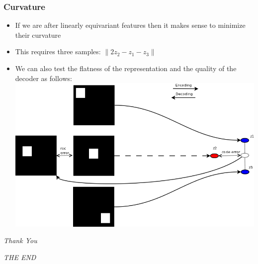 \documentclass{beamer}
\begin{document}
\begin{frame}
\frametitle{Curvature} 
\begin{itemize}
\item If we are after linearly equivariant features then it makes sense to minimize their curvature
\item This requires three samples: $\|2z_2 - z_1 - z_3\|$ 
\item We can also test the flatness of the representation and the quality of the decoder as follows: 
\includegraphics[scale=0.3]{./figures/testing.png} 
\end{itemize}
\end{frame} 

\begin{frame}
\centerline{
\huge
\emph{Thank You}} 
\vspace{10 mm} 
\centerline{
\huge
\emph{THE END}} 

\end{frame}
\end{document}
